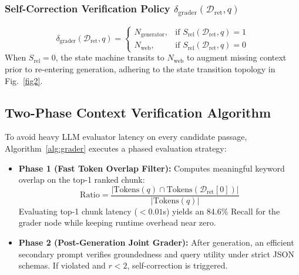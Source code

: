 \documentclass[conference]{IEEEtran}
\begin{document}
\subsubsection{Self-Correction Verification Policy \texorpdfstring{$\delta_{\text{grader}}(\mathcal{D}_{\text{ret}}, q)$}{delta\_grader(D\_ret, q)}}
\begin{equation}
\delta_{\text{grader}}(\mathcal{D}_{\text{ret}}, q) = 
\begin{cases} 
N_{\text{generator}}, & \text{if } S_{\text{rel}}(\mathcal{D}_{\text{ret}}, q) = 1 \\ 
N_{\text{web}}, & \text{if } S_{\text{rel}}(\mathcal{D}_{\text{ret}}, q) = 0 
\end{cases}
\end{equation}
When $S_{\text{rel}} = 0$, the state machine transits to $N_{\text{web}}$ to augment missing context prior to re-entering generation, adhering to the state transition topology in Fig.~\ref{fig2}.

\subsection{Two-Phase Context Verification Algorithm}
To avoid heavy LLM evaluator latency on every candidate passage, Algorithm~\ref{alg:grader} executes a phased evaluation strategy:
\begin{itemize}
    \item \textbf{Phase 1 (Fast Token Overlap Filter):} Computes meaningful keyword overlap on the top-1 ranked chunk:
    \begin{equation}
    \text{Ratio} = \frac{\bigl|\text{Tokens}(q) \cap \text{Tokens}(\mathcal{D}_{\text{ret}}[0])\bigr|}{\bigl|\text{Tokens}(q)\bigr|}
    \end{equation}
    Evaluating top-1 chunk latency ($< 0.01$s) yields an 84.6\% Recall for the grader node while keeping runtime overhead near zero.
    \item \textbf{Phase 2 (Post-Generation Joint Grader):} After generation, an efficient secondary prompt verifies groundedness and query utility under strict JSON schemas. If violated and $r < 2$, self-correction is triggered.
\end{itemize}
\end{document}
